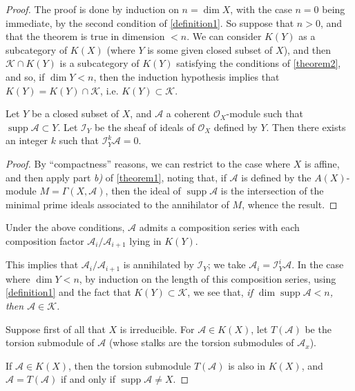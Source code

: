 \documentclass{article}
\theoremstyle{plain}
\newenvironment{lemma}[1]
    {\renewcommand\theinnercustomlemma{#1}\innercustomlemma}
    {\endinnercustomlemma}
\newenvironment{corollary}[1]
    {\renewcommand\theinnercustomcorollary{#1}\innercustomcorollary}
    {\endinnercustomcorollary}
\theoremstyle{definition}
\newcommand{\sh}[1]{{\mathscr{#1}}}
\newcommand{\cat}[1]{{\mathcal{#1}}}
\newcommand{\supp}{\operatorname{supp}}
\newcommand{\oldpage}[1]{\marginpar{\footnotesize$\Big\vert$ \textit{p.~#1}}}
\begin{document}
\begin{proof}
  The proof is done by induction on $n=\dim X$, with the case $n=0$ being immediate, by the second condition of \cref{definition1}.
  So suppose that $n>0$, and that the theorem is true in dimension $<n$.
  We can consider $K(Y)$ as a subcategory of $K(X)$ (where $Y$ is some given closed subset of $X$), and then $\cat{K}\cap K(Y)$ is a subcategory of $K(Y)$ satisfying the conditions of \cref{theorem2}, and so, if $\dim Y<n$, then the induction hypothesis implies that $K(Y)=K(Y)\cap\cat{K}$, i.e. $K(Y)\subset\cat{K}$.

  \begin{lemma}{1}
  \label{lemma1}
    Let $Y$ be a closed subset of $X$, and $\sh{A}$ a coherent $\sh{O}_X$-module such that $\supp\sh{A}\subset Y$.
    Let $\sh{I}_Y$ be the sheaf of ideals of $\sh{O}_X$ defined by $Y$.
    Then there exists an integer $k$ such that $\sh{I}_Y^k\sh{A}=0$.
  \end{lemma}

  \begin{proof}
    By ``compactness'' reasons, we can restrict to the case where $X$ is affine, and then apply part \emph{b)} of \cref{theorem1}, noting that, if $\sh{A}$ is defined by the $A(X)$-module $M=\Gamma(X,\sh{A})$, then the ideal of $\supp\sh{A}$ is the intersection of the minimal prime ideals associated to the annihilator of $M$, whence the result.
  \end{proof}

  \begin{corollary}{\!\!}
  \label{corollary-1}
    Under the above conditions, $\sh{A}$ admits a composition series with each composition factor $\sh{A}_i/\sh{A}_{i+1}$ lying in $K(Y)$.
  \end{corollary}

  This implies that $\sh{A}_i/\sh{A}_{i+1}$ is annihilated by $\sh{I}_Y$;
  we take $\sh{A}_i=\sh{I}_Y^i\sh{A}$.
  In the case where $\dim Y<n$, by induction on the length of
  \oldpage{2-03}
  this composition series, using \cref{definition1} and the fact that $K(Y)\subset\cat{K}$, we see that, \emph{if $\dim\supp\sh{A}<n$, then $\sh{A}\in\cat{K}$.}

  Suppose first of all that $X$ is irreducible.
  For $\sh{A}\in K(X)$, let $T(\sh{A})$ be the torsion submodule of $\sh{A}$ (whose stalks are the torsion submodules of $\sh{A}_x$).

  \begin{lemma}{2}
  \label{lemma2}
    If $\sh{A}\in K(X)$, then the torsion submodule $T(\sh{A})$ is also in $K(X)$, and $\sh{A}=T(\sh{A})$ if and only if $\supp\sh{A}\neq X$.
  \end{lemma}


\end{proof}
\end{document}
